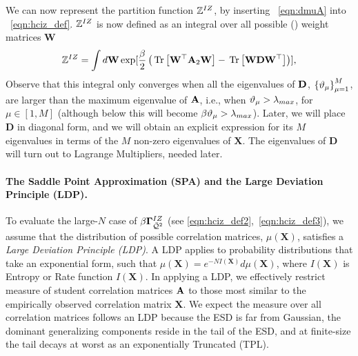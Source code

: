 We can now represent the partition function
$\mathbb{Z}^{IZ}$, by inserting \EQN~\ref{eqn:dmuA} into \EQN~\ref{eqn:hciz_def}.
$\mathbb{Z}^{IZ}$ is now defined as an integral over all
possible (\Teacher) weight matrices $\mathbf{W}$
\begin{equation}
  \label{eqn:ZD0}
    \mathbb{Z}^{IZ}=\int d\mathbf{W}\exp[\frac{\beta}{2}\left
    (\mbox{}\operatorname{Tr}\left[\mathbf{W}^{\top}\mathbf{A}_{2}\mathbf{W}\right]-\mbox{}\operatorname{Tr}\left[\mathbf{W}\mathbf{D}\mathbf{W}^{\top}\right]  
    \right)]  ,
\end{equation}
Observe that this integral only converges when all the eigenvalues of $\mathbf{D}$, 
$\left\{ \vartheta_{\mu} \right\}_{\mu=1}^{M}$, 
are larger than the maximum eigenvalue of $\mathbf{\mathbf{A}}$, i.e., when $\vartheta_{\mu} >\lambda_{max}$, for $\mu\in[1,M]$
(although below this will become $\beta\vartheta_{\mu} >\lambda_{max}$).
Later, we will place $\mathbf{D}$ in diagonal form, and we will obtain an explicit expression for its $M$ eigenvalues in terms of the $M$ non-zero eigenvalues of $\mathbf{X}$.
The eigenvalues of $\mathbf{D}$ will turn out to Lagrange Multipliers, needed later.


\paragraph{The Saddle Point Approximation (SPA) and the Large Deviation Principle (LDP).}

To evaluate the large-$N$ case of $\beta\mathbf{\Gamma}^{IZ}_{\bar{\mathcal{Q}}^{2}}$ (see \ref{eqn:hciz_def2},~\ref{eqn:hciz_def3}), 
we assume that the distribution of possible \Teacher correlation matrices,
$\mu(\mathbf{X})$, satisfies a \emph{Large Deviation Principle (LDP)}.
A LDP applies to probability distributions that take an exponential form,
such that $\mu(\mathbf{X})=e^{-N I(\mathbf{X})}d\mu(\mathbf{X})$,
where  $I(\mathbf{X})$ is Entropy or Rate function $I(\mathbf{X})$.
In applying a LDP, we effectively restrict measure of student correlation matrices $\mathbf{\mathbf{A}}$
to those most similar to the empirically observed \Teacher correlation matrix $\mathbf{X}$.
%
We expect the measure over all \Teacher correlation matrices
follows an LDP because the ESD is far from Gaussian,
the dominant generalizing components reside in the tail of the ESD,
and at finite-size the tail decays at worst as an exponentially
Truncated \PowerLaw (TPL).

